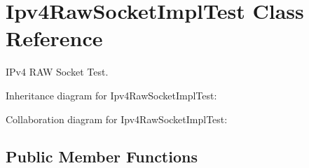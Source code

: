 \hypertarget{classIpv4RawSocketImplTest}{}\section{Ipv4\+Raw\+Socket\+Impl\+Test Class Reference}
\label{classIpv4RawSocketImplTest}


I\+Pv4 R\+AW Socket Test.  




Inheritance diagram for Ipv4\+Raw\+Socket\+Impl\+Test\+:


Collaboration diagram for Ipv4\+Raw\+Socket\+Impl\+Test\+:
\subsection*{Public Member Functions}
